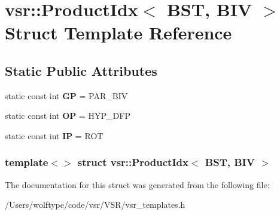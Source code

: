 \hypertarget{structvsr_1_1_product_idx_3_01_b_s_t_00_01_b_i_v_01_4}{\section{vsr\-:\-:Product\-Idx$<$ B\-S\-T, B\-I\-V $>$ Struct Template Reference}
\label{structvsr_1_1_product_idx_3_01_b_s_t_00_01_b_i_v_01_4}
}
\subsection*{Static Public Attributes}
\begin{DoxyCompactItemize}
\item 
\hypertarget{structvsr_1_1_product_idx_3_01_b_s_t_00_01_b_i_v_01_4_acc6f0c4b3d0674854f8f15a9c75377ea}{static const int {\bfseries G\-P} = P\-A\-R\-\_\-\-B\-I\-V}\label{structvsr_1_1_product_idx_3_01_b_s_t_00_01_b_i_v_01_4_acc6f0c4b3d0674854f8f15a9c75377ea}

\item 
\hypertarget{structvsr_1_1_product_idx_3_01_b_s_t_00_01_b_i_v_01_4_a9af83b99394f5761dec82192bca1753d}{static const int {\bfseries O\-P} = H\-Y\-P\-\_\-\-D\-F\-P}\label{structvsr_1_1_product_idx_3_01_b_s_t_00_01_b_i_v_01_4_a9af83b99394f5761dec82192bca1753d}

\item 
\hypertarget{structvsr_1_1_product_idx_3_01_b_s_t_00_01_b_i_v_01_4_a3e8849e9dc5275189bc6ae60e2ec4c94}{static const int {\bfseries I\-P} = R\-O\-T}\label{structvsr_1_1_product_idx_3_01_b_s_t_00_01_b_i_v_01_4_a3e8849e9dc5275189bc6ae60e2ec4c94}

\end{DoxyCompactItemize}
\subsubsection*{template$<$$>$ struct vsr\-::\-Product\-Idx$<$ B\-S\-T, B\-I\-V $>$}



The documentation for this struct was generated from the following file\-:\begin{DoxyCompactItemize}
\item 
/\-Users/wolftype/code/vsr/\-V\-S\-R/vsr\-\_\-templates.\-h\end{DoxyCompactItemize}

